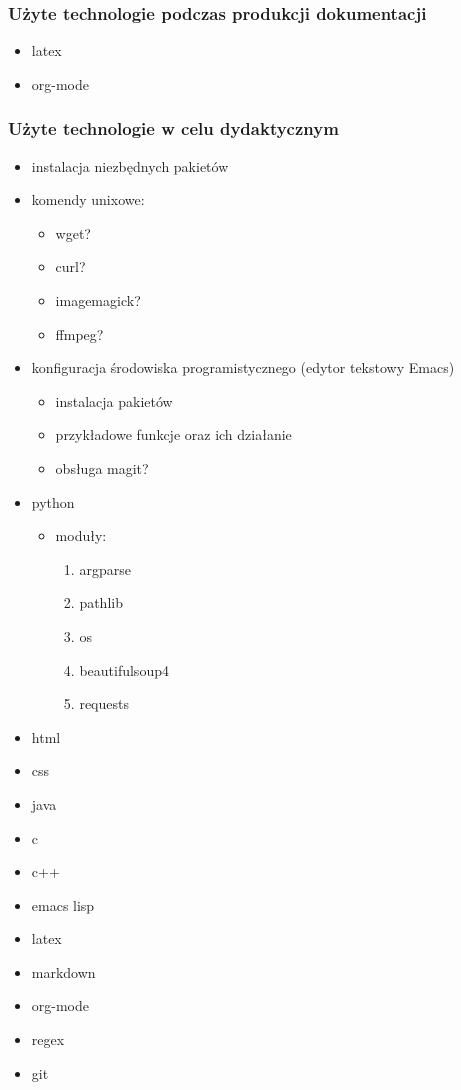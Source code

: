 \documentclass[11pt]{article}
\begin{document}
\subsubsection{Użyte technologie podczas produkcji dokumentacji}
\label{sec:org8ad15ca}
\begin{itemize}
\item latex
\item org-mode
\end{itemize}
\subsubsection{Użyte technologie w celu dydaktycznym}
\label{sec:org2e2a2a5}
\begin{itemize}
\item instalacja niezbędnych pakietów
\item komendy unixowe:
\begin{itemize}
\item wget?
\item curl?
\item imagemagick?
\item ffmpeg?
\end{itemize}
\item konfiguracja środowiska programistycznego (edytor tekstowy Emacs)
\begin{itemize}
\item instalacja pakietów
\item przykładowe funkcje oraz ich działanie
\item obsługa magit?
\end{itemize}
\item python
\begin{itemize}
\item moduły:
\begin{enumerate}
\item argparse
\item pathlib
\item os
\item beautifulsoup4
\item requests
\end{enumerate}
\end{itemize}
\item html
\item css
\item java
\item c
\item c++
\item emacs lisp
\item latex
\item markdown
\item org-mode
\item regex
\item git
\end{itemize}
\end{document}
